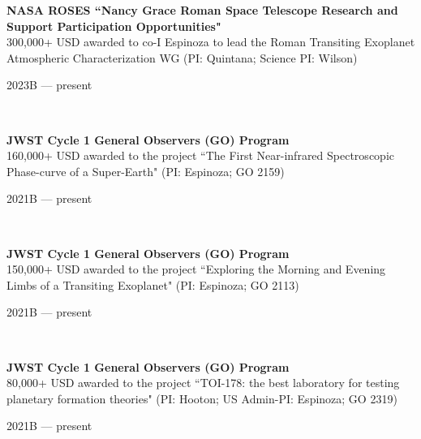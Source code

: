 \documentclass[12pt, a4paper]{article} %
\begin{document}
\begin{minipage}[t]{0.7\textwidth}
\begin{flushleft}%
  \setlength{\leftskip}{0.2cm}%
\textbf{NASA ROSES ``Nancy Grace Roman Space Telescope Research and Support Participation Opportunities" }\\
300,000+ USD awarded to co-I Espinoza to lead the Roman Transiting Exoplanet Atmospheric Characterization WG (PI: Quintana; Science PI: Wilson)
\end{flushleft}
\end{minipage}
\begin{minipage}[t]{0.3\textwidth}
\hfill 2023B --- present
\end{minipage}\\

\begin{minipage}[t]{0.7\textwidth}
\begin{flushleft}%
  \setlength{\leftskip}{0.2cm}%
\textbf{JWST Cycle 1 General Observers (GO) Program}\\
160,000+ USD awarded to the project ``The First Near-infrared Spectroscopic Phase-curve of a Super-Earth" (PI: Espinoza; GO 2159)
\end{flushleft}
\end{minipage}
\begin{minipage}[t]{0.3\textwidth}
\hfill 2021B --- present
\end{minipage}\\

\begin{minipage}[t]{0.7\textwidth}
\begin{flushleft}%
  \setlength{\leftskip}{0.2cm}%
\textbf{JWST Cycle 1 General Observers (GO) Program}\\
150,000+ USD awarded to the project ``Exploring the Morning and Evening Limbs of a Transiting Exoplanet" (PI: Espinoza; GO 2113)
\end{flushleft}
\end{minipage}
\begin{minipage}[t]{0.3\textwidth}
\hfill 2021B --- present
\end{minipage}\\

\begin{minipage}[t]{0.7\textwidth}
\begin{flushleft}%
  \setlength{\leftskip}{0.2cm}%
\textbf{JWST Cycle 1 General Observers (GO) Program}\\
80,000+ USD awarded to the project ``TOI-178: the best laboratory for testing planetary formation theories" (PI: Hooton; US Admin-PI: Espinoza; GO 2319)
\end{flushleft}
\end{minipage}
\begin{minipage}[t]{0.3\textwidth}
\hfill 2021B --- present
\end{minipage}\\
\end{document}

